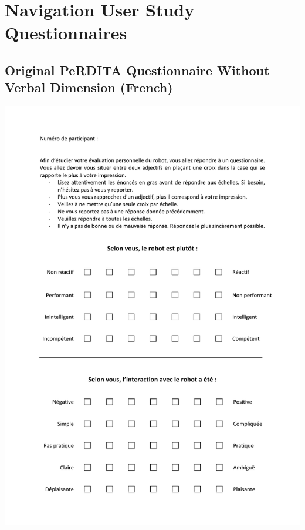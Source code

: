 \chapter{Navigation User Study Questionnaires}
\label{annex:questionnaires}
\section[PeRDITA (French)]{Original PeRDITA Questionnaire Without Verbal Dimension (French)}
\begin{center}
\includegraphics[page=1, width=\textwidth]{Annexes/PeRDITA_vParticipant_sansDimVerbale.pdf} 
\end{center}

